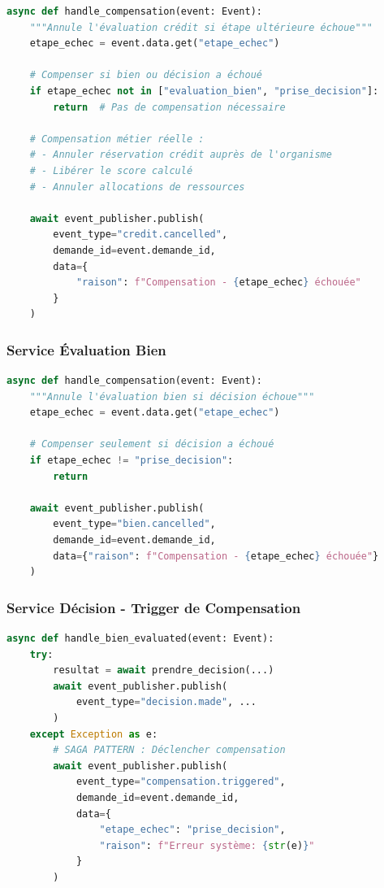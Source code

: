 \documentclass[12pt,a4paper]{article}
\begin{document}
\begin{lstlisting}[language=Python]
async def handle_compensation(event: Event):
    """Annule l'évaluation crédit si étape ultérieure échoue"""
    etape_echec = event.data.get("etape_echec")
    
    # Compenser si bien ou décision a échoué
    if etape_echec not in ["evaluation_bien", "prise_decision"]:
        return  # Pas de compensation nécessaire
    
    # Compensation métier réelle :
    # - Annuler réservation crédit auprès de l'organisme
    # - Libérer le score calculé
    # - Annuler allocations de ressources
    
    await event_publisher.publish(
        event_type="credit.cancelled",
        demande_id=event.demande_id,
        data={
            "raison": f"Compensation - {etape_echec} échouée"
        }
    )
\end{lstlisting}

\subsubsection{Service Évaluation Bien}

\begin{lstlisting}[language=Python]
async def handle_compensation(event: Event):
    """Annule l'évaluation bien si décision échoue"""
    etape_echec = event.data.get("etape_echec")
    
    # Compenser seulement si décision a échoué
    if etape_echec != "prise_decision":
        return
    
    await event_publisher.publish(
        event_type="bien.cancelled",
        demande_id=event.demande_id,
        data={"raison": f"Compensation - {etape_echec} échouée"}
    )
\end{lstlisting}

\subsubsection{Service Décision - Trigger de Compensation}

\begin{lstlisting}[language=Python]
async def handle_bien_evaluated(event: Event):
    try:
        resultat = await prendre_decision(...)
        await event_publisher.publish(
            event_type="decision.made", ...
        )
    except Exception as e:
        # SAGA PATTERN : Déclencher compensation
        await event_publisher.publish(
            event_type="compensation.triggered",
            demande_id=event.demande_id,
            data={
                "etape_echec": "prise_decision",
                "raison": f"Erreur système: {str(e)}"
            }
        )
\end{lstlisting}
\end{document}
